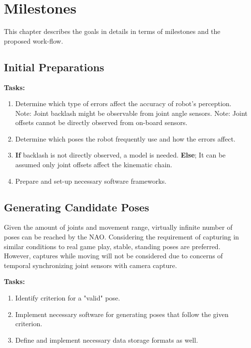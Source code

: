 \documentclass[english, printversion, nomenclature, notitle]{tuvisionthesis} %
\begin{document}
\chapter{Milestones}
\label{chap:milestones}

This chapter describes the goals in details in terms of milestones and the proposed work-flow.

\section{Initial Preparations}
\textbf{Tasks:}
\begin{enumerate}
	\item Determine which type of errors affect the accuracy of robot's perception.
	\subitem Note: Joint backlash might be observable from joint angle sensors.
	\subitem Note: Joint offsets cannot be directly observed from on-board sensors.
	\item Determine which poses the robot frequently use and how the errors affect.
	\item \textbf{If} backlash is not directly observed, a model is needed.
	\subitem \textbf{Else}; It can be assumed only joint offsets affect the kinematic chain.
	\item Prepare and set-up necessary software frameworks.
\end{enumerate}

\section{Generating Candidate Poses}
Given the amount of joints and movement range, virtually infinite number of poses can be reached by the NAO. Considering the requirement of capturing in similar conditions to real game play, stable, standing poses are preferred. However, captures while moving will not be considered due to concerns of temporal synchronizing joint sensors with camera capture.

\textbf{Tasks:}
\begin{enumerate}
	\item Identify criterion for a "valid" pose.
	\item Implement necessary software for generating poses that follow the given criterion.
	\item Define and implement necessary data storage formats as well.
\end{enumerate}
\end{document}
